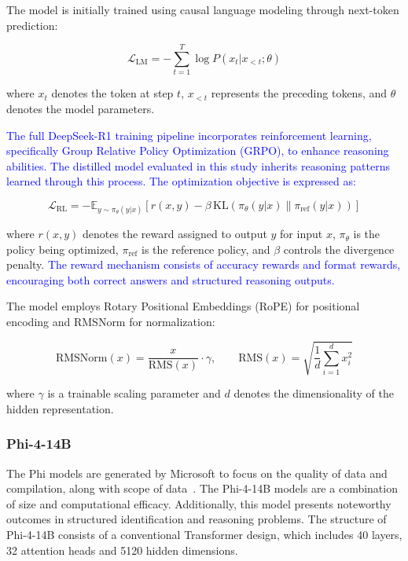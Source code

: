 \documentclass[10pt,letterpaper]{article}
\newcommand{\rev}[1]{\textcolor{blue}{#1}}
\begin{document}
The model is initially trained using causal language modeling through next-token prediction:

\begin{equation}
\mathcal{L}_{\text{LM}} = -\sum_{t=1}^{T} \log P(x_t | x_{<t}; \theta)
\label{eq:lm_loss}
\end{equation}

where \(x_t\) denotes the token at step \(t\), \(x_{<t}\) represents the preceding tokens, and \(\theta\) denotes the model parameters.

\rev{The full DeepSeek-R1 training pipeline incorporates reinforcement learning, specifically Group Relative Policy Optimization (GRPO), to enhance reasoning abilities. The distilled model evaluated in this study inherits reasoning patterns learned through this process. The optimization objective is expressed as:}

\begin{equation}
\mathcal{L}_{\text{RL}}
=
-\mathbb{E}_{y \sim \pi_\theta(y|x)}
\left[
r(x,y)
-
\beta
\,\mathrm{KL}
\left(
\pi_\theta(y|x)
\|
\pi_{\mathrm{ref}}(y|x)
\right)
\right]
\label{eq:rl_loss}
\end{equation}

where \(r(x,y)\) denotes the reward assigned to output \(y\) for input \(x\), \(\pi_\theta\) is the policy being optimized, \(\pi_{\mathrm{ref}}\) is the reference policy, and \(\beta\) controls the divergence penalty. \rev{The reward mechanism consists of accuracy rewards and format rewards, encouraging both correct answers and structured reasoning outputs.}

The model employs Rotary Positional Embeddings (RoPE) for positional encoding and RMSNorm for normalization:

\begin{equation}
\text{RMSNorm}(x)
=
\frac{x}{\text{RMS}(x)}
\cdot \gamma,
\qquad
\text{RMS}(x)
=
\sqrt{\frac{1}{d}\sum_{i=1}^{d}x_i^2}
\label{eq:rmsnorm}
\end{equation}

where \(\gamma\) is a trainable scaling parameter and \(d\) denotes the dimensionality of the hidden representation.


\subsubsection*{Phi-4-14B}

The Phi models are generated by Microsoft to focus on the quality of data and compilation, along with scope of data~\cite{b39}. The Phi-4-14B models are a combination of size and computational efficacy. Additionally, this model presents noteworthy outcomes in structured identification and reasoning problems. The structure of Phi-4-14B consists of a conventional Transformer design, which includes 40 layers, 32 attention heads and 5120 hidden dimensions. 
\end{document}
